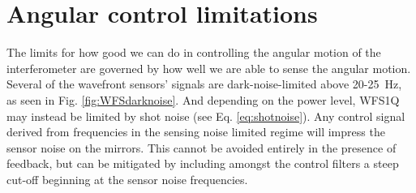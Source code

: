 \section{Angular control limitations}
\label{sec:ASClimits}

The limits for how good we can do in controlling the angular motion of the interferometer are governed by how well we are able to sense the angular motion. Several of the wavefront sensors' signals are dark-noise-limited above 20-25~Hz, as seen in Fig. \ref{fig:WFSdarknoise}. And depending on the power level, WFS1Q may instead be limited by shot noise (see Eq. \ref{eq:shotnoise}). Any control signal derived from frequencies in the sensing noise limited regime will impress the sensor noise on the mirrors. This cannot be avoided entirely in the presence of feedback, but can be mitigated by including amongst the control filters a steep cut-off beginning at the sensor noise frequencies. 

